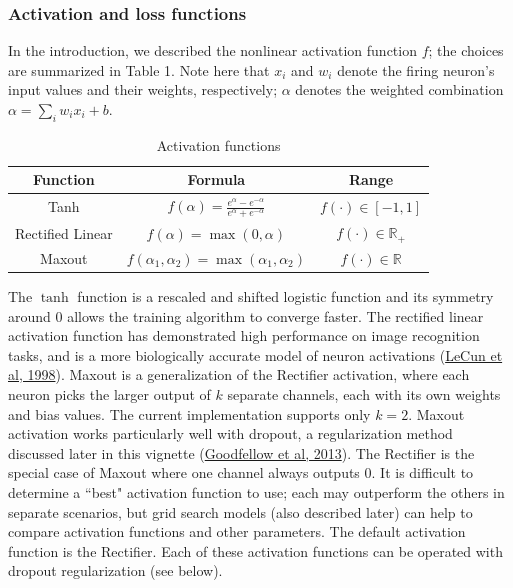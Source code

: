 \subsubsection{Activation and loss functions} \label{sssec:ActivationLoss}
In the introduction, we described the nonlinear activation function $f$; the choices are summarized in Table 1. Note here that $x_i$ and $w_i$ denote the firing neuron's input values and their weights, respectively; $\alpha$ denotes the weighted combination $\alpha = \sum_i w_i x_i+b$.
\begin{table}[ht] 
\caption{Activation functions }
\centering %
\begin{tabular}{c c c} %
\hline\hline %
Function & Formula & Range \\ [0.5ex] %
\hline %
Tanh & $f(\alpha) = \frac{e^{\alpha} - e ^{-\alpha}}{e^\alpha + e ^{-\alpha}}$ & $f(\cdot) \in [-1,1]$ \\ %
Rectified Linear & $f(\alpha) = \max(0,\alpha)$ & $f(\cdot) \in \mathbb{R}_+$ \\
Maxout & $f(\alpha_1,\alpha_2) = \max(\alpha_1,\alpha_2) $ & $f(\cdot) \in \mathbb{R}$\\  %
\hline %
\end{tabular} 
\label{table:nonlin} %
\end{table}
The $\tanh$ function is a rescaled and shifted logistic function and its symmetry around 0 allows the training algorithm to converge faster. The rectified linear activation function has demonstrated high performance on image recognition tasks, and is a more biologically accurate model of neuron activations (\href{http://yann.lecun.com/exdb/publis/pdf/lecun-98b.pdf}{LeCun et al, 1998}). Maxout is a generalization of the Rectifier activation, where each neuron picks the larger output of $k$ separate channels, each with its own weights and bias values. The current implementation supports only $k=2$. Maxout activation works particularly well with dropout, a regularization method discussed later in this vignette (\href{http://arxiv.org/pdf/1302.4389.pdf}{Goodfellow et al, 2013}). The Rectifier is the special case of Maxout where one channel always outputs 0.
It is difficult to determine a ``best" activation function to use; each may outperform the others in separate scenarios, but grid search models (also described later) can help to compare activation functions and other parameters. The default activation function is the Rectifier. Each of these activation functions can be operated with dropout regularization (see below).

